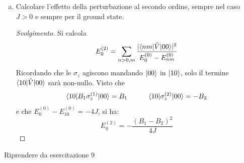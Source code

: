 \documentclass[11pt, a4paper]{scrartcl} %
\numberwithin{equation}{subsection}
\theoremstyle{style2}
\theoremstyle{style1}
\renewcommand\qedsymbol{$\blacksquare$}
\newenvironment{svolgimento}{\renewcommand\qedsymbol{$\spadesuit$}\begin{proof}[Svolgimento]}{\end{proof}}
\begin{document}
\begin{enumerate}[(a).]
\begin{svolgimento}
		Il ground state di energia $- 3J$ \`e $\ket{00} = \frac{\ket{\uparrow\downarrow} - \ket{\downarrow\uparrow} }{\sqrt{2}} $, quindi il primo ordine perturbativo \`e dato da:
		\[
		\Braket{ 00| B_1 \sigma ^{(1)} _z + B_2 \sigma _z^{(2)} |00} = 0
		\] 
	Questo risultato \`e giustificato dal fatto che 
	\[
	\sigma ^{(1)} _z \frac{\ket{\uparrow\downarrow} - \ket{\downarrow\uparrow} }{\sqrt{2} } = \frac{\ket{\uparrow\downarrow} + \ket{\downarrow\uparrow} }{\sqrt{2} }
	\] 
	quindi, applicando il bra a sinistra, i due sono ortogonali e si ottiene $0$. 
	Lo stesso vale per $\sigma ^{(2)} _z$.
Questo era anche intuibile perch\'e sviluppando la radice per $B_1,B_2$ piccoli, si vede che la correzione \`e quadratica in $B_1$ e $B_2$.
	\end{svolgimento}
\item Calcolare l'effetto della perturbazione al secondo ordine, sempre nel caso $J >0$ e sempre per il ground state.	
	\begin{svolgimento}
		Si calcola 
		\[
		E^{(2)} _0 = \sum_{n>0,m}^{} \frac{\lvert \braket{nm|\hat{V}|00}  \rvert ^2}{E^{(0)} _0 - E_{nm} ^{(0)} }
		\] 
		Ricordando che le $\sigma _z$ agiscono mandando $\ket{00} $ in $\ket{10} $, solo il termine $\braket{10|\hat{V}|00} $ sar\`a non-nullo.
		Visto che
		\[
		\braket{10|B_1 \sigma ^{(1)} _z|00} = B_1 \hspace{1cm}\braket{ 10|\sigma ^{(2)} _z |00} = - B_2
		\] 
		e che $E_0^{(0)} - E_{10} ^{(0)}  = -4J$, si ha:
		\[
		E^{(2)} _0 =- \frac{(B_1-B_2)^2}{4J} 
		\] 
	\end{svolgimento}
\end{enumerate}

\begin{center}
	Riprendere da esercitazione 9	
\end{center}
\end{document}
